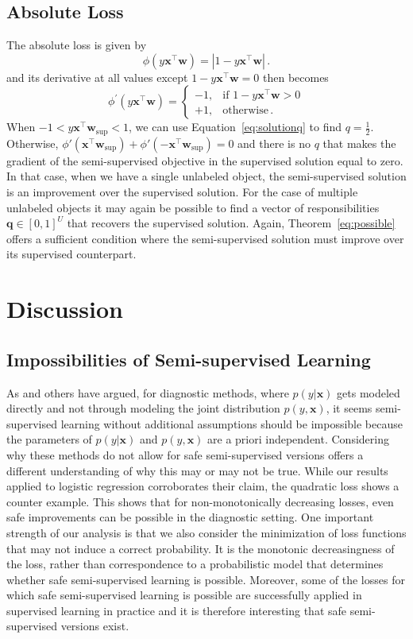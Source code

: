 \documentclass[twoside]{memoir}\usepackage[]{graphicx}\usepackage{xcolor}
\begin{document}
\subsection{Absolute Loss}
The absolute loss is given by
$$\phi(y \mathbf{x}^\top \mathbf{w})=|1-y \mathbf{x}^\top \mathbf{w}| \, .$$
and its derivative at all values except $1-y \mathbf{x}^\top \mathbf{w}=0$ then becomes
$$
\phi^\prime (y \mathbf{x}^\top \mathbf{w}) =
\begin{cases}
-1 ,& \text{if } 1-y \mathbf{x}^\top \mathbf{w}>0\\
+1,& \text{otherwise} \, .
\end{cases}
$$
When $-1 <y \mathbf{x}^\top \mathbf{w}_\mathrm{sup}<1$, we can use Equation~\eqref{eq:solutionq} to find $q=\tfrac{1}{2}$. Otherwise, $\phi'(\mathbf{x}^\top \mathbf{w}_\mathrm{sup}) + \phi'(-\mathbf{x}^\top \mathbf{w}_\mathrm{sup}) = 0$ and there is no $q$ that makes the gradient of the semi-supervised objective in the supervised solution equal to zero. In that case, when we have a single unlabeled object, the semi-supervised solution is an improvement over the supervised solution. For the case of multiple unlabeled objects it may again be possible to find a vector of responsibilities $\mathbf{q} \in [0,1]^U$ that recovers the supervised solution. Again, Theorem~\ref{eq:possible} offers a sufficient condition where the semi-supervised solution must improve over its supervised counterpart.

\section{Discussion}  \label{section:Discussion}
\subsection{Impossibilities of Semi-supervised Learning}
As \citet{Seeger2001} and others have argued, for diagnostic methods, where $p(y|\mathbf{x})$ gets modeled directly and not through modeling the joint distribution $p(y,\mathbf{x})$, it seems semi-supervised learning without additional assumptions should be impossible because the parameters of $p(y|\mathbf{x})$ and $p(y,\mathbf{x})$ are a priori independent. Considering why these methods do not allow for safe semi-supervised versions offers a different understanding of why this may or may not be true.  While our results applied to logistic regression corroborates their claim, the quadratic loss shows a counter example. This shows that for non-monotonically decreasing losses, even safe improvements can be possible in the diagnostic setting. One important strength of our analysis is that we also consider the minimization of loss functions that may not induce a correct probability. It is the monotonic decreasingness of the loss, rather than correspondence to a probabilistic model that determines whether safe semi-supervised learning is possible. Moreover, some of the losses for which safe semi-supervised learning is possible are successfully applied in supervised learning in practice and it is therefore interesting that safe semi-supervised versions exist.
\end{document}

